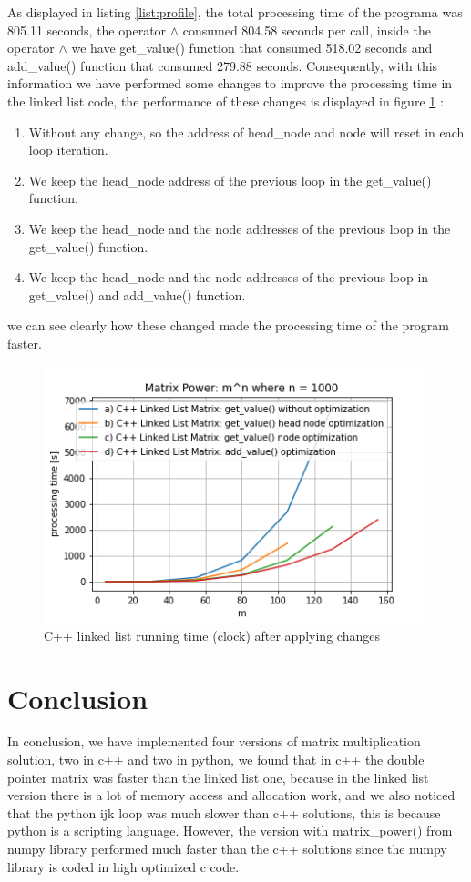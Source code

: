\documentclass[12pt]{article}
\begin{document}
As displayed in listing \ref{list:profile}, the total processing time of the programa was 805.11 seconds, the operator $\wedge$ consumed 804.58 seconds per call, inside the operator $\wedge$  we have get\_value() function that consumed 518.02 seconds and add\_value() function that consumed 279.88 seconds.
Consequently, with this information we have performed some changes to improve the processing time in the linked list code, the performance of  these changes is displayed in figure \ref{fig:opt} :

\begin{enumerate}[label=\alph*)]
    \item Without any change, so the address of head\_node and node will reset in each loop iteration. 
    \item We keep the head\_node address of the previous loop in the get\_value() function.
    \item We keep the head\_node and the node addresses of the previous loop in the get\_value() function.
    \item We keep the head\_node and the node addresses of the previous loop in get\_value() and add\_value() function.
\end{enumerate}


we can see clearly how these changed made the processing time of the program faster.

\begin{figure}[H]
    \centering
    
    \includegraphics[width=0.7\linewidth]{figures/cpp_linked_list_fixed_n_optimization.png}
    
    \caption{C++ linked list running time (clock) after applying changes} 
    \label{fig:opt}
\end{figure}

    
    \section{Conclusion}
    In conclusion, we have implemented four versions of matrix multiplication solution, two in c++ and two in python, we found that in c++ the double pointer matrix was faster than the linked list one, because in the linked list version there is a lot of memory access and allocation work, and we also noticed that the python ijk loop was much slower than c++ solutions, this is because python is a scripting language. However, the version with matrix\_power() from numpy library performed much faster than the c++ solutions since the numpy library is coded in high optimized c code. 
    
\end{document}
